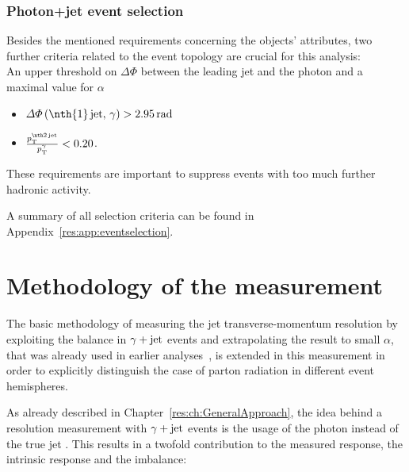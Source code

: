 \subsection{Photon+jet event selection}
Besides the mentioned requirements concerning the objects' attributes, two further criteria related to the event topology are crucial for this analysis:\\
An upper threshold on $\Delta \Phi$ between the leading jet and the photon and a maximal value for $\alpha$
\begin{itemize}
 \item $\Delta \Phi \left(\text{\nth{1}\,jet},\,\gamma \right) > 2.95\,\unit{rad}$
 \item $\frac{\ptsecondjet}{\ptgamma} < 0.20$.
\end{itemize}
These requirements are important to suppress events with too much further hadronic activity.

A summary of all selection criteria can be found in Appendix~\ref{res:app:eventselection}.

\FloatBarrier
\chapter{Methodology of the measurement}
\label{res:ch:methodology}

The basic methodology of measuring the jet transverse-momentum resolution by exploiting the \pt balance in $\gamma + \text{jet}$ events and extrapolating the result to small $\alpha$, that was already used in earlier analyses~\cite{bib:CMS:JERCPaper_2011,CMS:PAS:JETResolution_7TeV}, 
is extended in this measurement in order to explicitly distinguish the case of parton radiation in different event hemispheres.

As already described in Chapter~\ref{res:ch:GeneralApproach}, the idea behind a resolution measurement with $\gamma + \text{jet}$ events is the usage of the photon \pt instead of the true jet \pt.
This results in a twofold contribution to the measured response, the intrinsic response and the imbalance:

